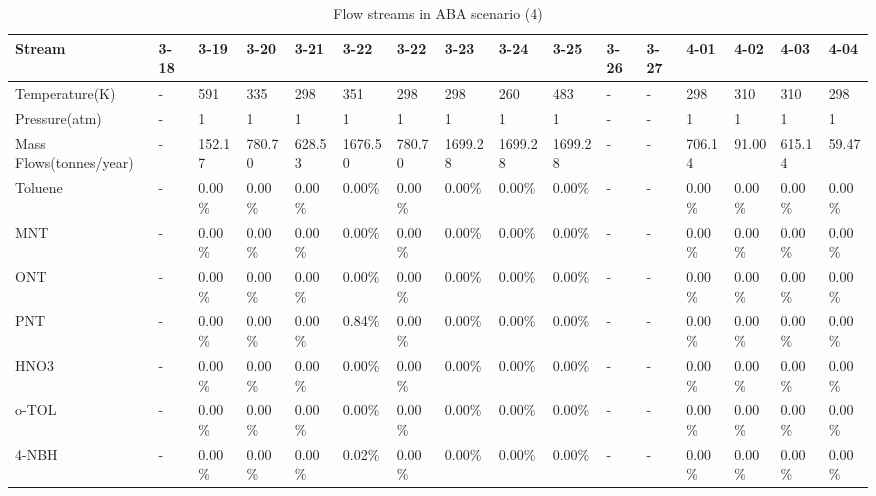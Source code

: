 \begin{landscape}
\begin{table}[H]
\centering
\caption{Flow streams in ABA scenario (4)}
\label{ABAFST4}
\begin{tabular}{|l|l|l|l|l|l|l|l|l|l|l|l|l|l|l|l|}
\hline
\textbf{Stream}         & 3-18 & 3-19     & 3-20    & 3-21    & 3-22    & 3-22    & 3-23    & 3-24    & 3-25    & 3-26 & 3-27 & 4-01    & 4-02     & 4-03    & 4-04    \\ \hline
Temperature(K)          & -    & 591      & 335     & 298     & 351     & 298     & 298     & 260     & 483     & -    & -    & 298     & 310      & 310     & 298     \\ \hline
Pressure(atm)           & -    & 1        & 1       & 1       & 1       & 1       & 1       & 1       & 1       & -    & -    & 1       & 1        & 1       & 1       \\ \hline
Mass Flows(tonnes/year) & -    & 152.17   & 780.70  & 628.53  & 1676.50 & 780.70  & 1699.28 & 1699.28 & 1699.28 & -    & -    & 706.14  & 91.00    & 615.14  & 59.47   \\ \hline
Toluene                 & -    & 0.00\%   & 0.00\%  & 0.00\%  & 0.00\%  & 0.00\%  & 0.00\%  & 0.00\%  & 0.00\%  & -    & -    & 0.00\%  & 0.00\%   & 0.00\%  & 0.00\%  \\ \hline
MNT                     & -    & 0.00\%   & 0.00\%  & 0.00\%  & 0.00\%  & 0.00\%  & 0.00\%  & 0.00\%  & 0.00\%  & -    & -    & 0.00\%  & 0.00\%   & 0.00\%  & 0.00\%  \\ \hline
ONT                     & -    & 0.00\%   & 0.00\%  & 0.00\%  & 0.00\%  & 0.00\%  & 0.00\%  & 0.00\%  & 0.00\%  & -    & -    & 0.00\%  & 0.00\%   & 0.00\%  & 0.00\%  \\ \hline
PNT                     & -    & 0.00\%   & 0.00\%  & 0.00\%  & 0.84\%  & 0.00\%  & 0.00\%  & 0.00\%  & 0.00\%  & -    & -    & 0.00\%  & 0.00\%   & 0.00\%  & 0.00\%  \\ \hline
HNO3                    & -    & 0.00\%   & 0.00\%  & 0.00\%  & 0.00\%  & 0.00\%  & 0.00\%  & 0.00\%  & 0.00\%  & -    & -    & 0.00\%  & 0.00\%   & 0.00\%  & 0.00\%  \\ \hline
o-TOL                   & -    & 0.00\%   & 0.00\%  & 0.00\%  & 0.00\%  & 0.00\%  & 0.00\%  & 0.00\%  & 0.00\%  & -    & -    & 0.00\%  & 0.00\%   & 0.00\%  & 0.00\%  \\ \hline
4-NBH                   & -    & 0.00\%   & 0.00\%  & 0.00\%  & 0.02\%  & 0.00\%  & 0.00\%  & 0.00\%  & 0.00\%  & -    & -    & 0.00\%  & 0.00\%   & 0.00\%  & 0.00\%  \\ \hline

\end{tabular}
\end{table}
\end{landscape}
